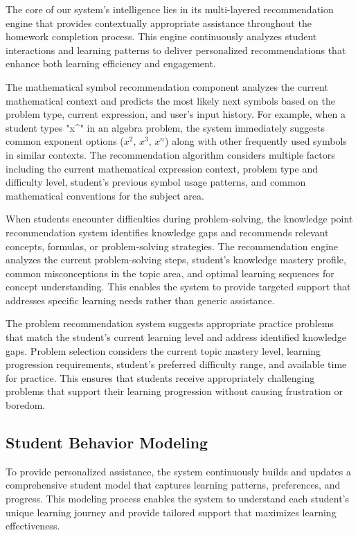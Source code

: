\documentclass[conference]{IEEEtran}
\begin{document}
The core of our system's intelligence lies in its multi-layered recommendation engine that provides contextually appropriate assistance throughout the homework completion process. This engine continuously analyzes student interactions and learning patterns to deliver personalized recommendations that enhance both learning efficiency and engagement.

The mathematical symbol recommendation component analyzes the current mathematical context and predicts the most likely next symbols based on the problem type, current expression, and user's input history. For example, when a student types "x\^{}" in an algebra problem, the system immediately suggests common exponent options ($x^2$, $x^3$, $x^n$) along with other frequently used symbols in similar contexts. The recommendation algorithm considers multiple factors including the current mathematical expression context, problem type and difficulty level, student's previous symbol usage patterns, and common mathematical conventions for the subject area.

When students encounter difficulties during problem-solving, the knowledge point recommendation system identifies knowledge gaps and recommends relevant concepts, formulas, or problem-solving strategies. The recommendation engine analyzes the current problem-solving steps, student's knowledge mastery profile, common misconceptions in the topic area, and optimal learning sequences for concept understanding. This enables the system to provide targeted support that addresses specific learning needs rather than generic assistance.

The problem recommendation system suggests appropriate practice problems that match the student's current learning level and address identified knowledge gaps. Problem selection considers the current topic mastery level, learning progression requirements, student's preferred difficulty range, and available time for practice. This ensures that students receive appropriately challenging problems that support their learning progression without causing frustration or boredom.

\subsection{Student Behavior Modeling}

To provide personalized assistance, the system continuously builds and updates a comprehensive student model that captures learning patterns, preferences, and progress. This modeling process enables the system to understand each student's unique learning journey and provide tailored support that maximizes learning effectiveness.
\end{document}
